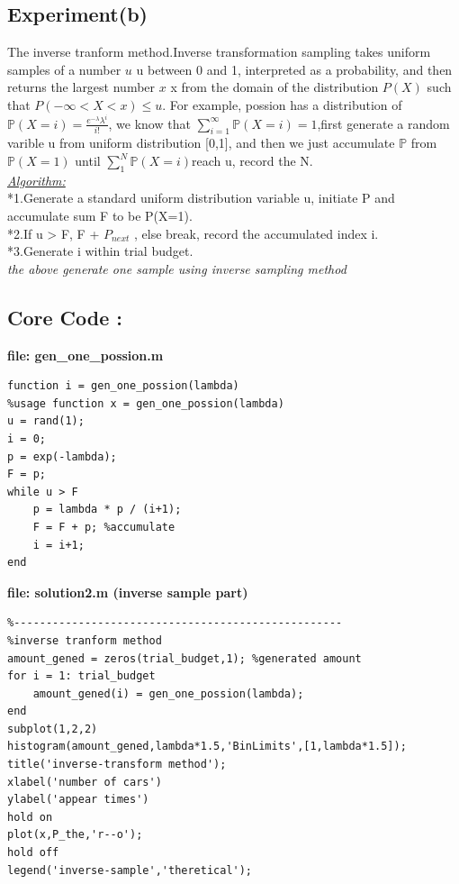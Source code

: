 \documentclass[twoside]{article}
\begin{document}
\subsection{\normalsize{Experiment(b)}}
The inverse tranform method.Inverse transformation sampling takes uniform samples of a number ${\displaystyle u}$ u between 0 and 1, interpreted as a probability, and then returns the largest number ${\displaystyle x}$ x from the domain of the distribution ${\displaystyle P(X)}$ such that ${\displaystyle P(-\infty <X<x)\leq u}$. For example, possion has a distribution of $\mathbb{P}(X = i)=\frac{e^{-\lambda}\lambda^i}{i!}$, we know that $\displaystyle\sum_{i=1}^{\infty}\mathbb{P}(X=i)=1$,first generate a random varible u from uniform distribution [0,1], and then we just accumulate $\mathbb{P}$ from $\mathbb{P}(X = 1)$ until $\displaystyle\sum_{1}^{N}\mathbb{P}(X = i)$reach u, record the N.\\[10pt]
\underline{\emph{Algorithm:}}\\[10pt]
*1.Generate a standard uniform distribution variable u, initiate P and accumulate sum F to be P(X=1).\\
*2.If u > F, F + $P_{next}$ , else break, record the accumulated index i.\\
*3.Generate i within trial budget. \\
\emph{the above generate one sample using inverse sampling method}\\
\subsection {\normalsize{Core Code :}}
\noindent \textbf {file: gen\_one\_possion.m}
\begin{lstlisting}
function i = gen_one_possion(lambda)
%usage function x = gen_one_possion(lambda)
u = rand(1);
i = 0;
p = exp(-lambda);
F = p;
while u > F
    p = lambda * p / (i+1);
    F = F + p; %accumulate
    i = i+1;
end
\end{lstlisting}
\noindent \textbf {file: solution2.m (inverse sample part)}
\begin{lstlisting}
%---------------------------------------------------
%inverse tranform method
amount_gened = zeros(trial_budget,1); %generated amount
for i = 1: trial_budget
    amount_gened(i) = gen_one_possion(lambda);
end
subplot(1,2,2)
histogram(amount_gened,lambda*1.5,'BinLimits',[1,lambda*1.5]);
title('inverse-transform method');
xlabel('number of cars')
ylabel('appear times')
hold on 
plot(x,P_the,'r--o');
hold off
legend('inverse-sample','theretical');
\end{lstlisting}
\end{document}
